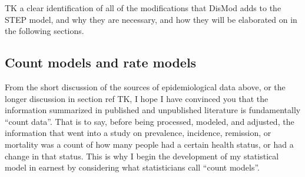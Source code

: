 TK a clear identification of all of the modifications that DisMod adds
to the STEP model, and why they are necessary, and how they will be
elaborated on in the following sections.

\subsection{Count models and rate models}
From the short discussion of the sources of epidemiological data
above, or the longer discussion in section ref TK, I hope I have
convinced you that the information summarized in published and
unpublished literature is fundamentally ``count data''. That is to say,
before being processed, modeled, and adjusted, the information that
went into a study on prevalence, incidence, remission, or mortality
was a count of how many people had a certain health status, or had a
change in that status. This is why I begin the development of my
statistical model in earnest by considering what statisticians call
``count models''.


